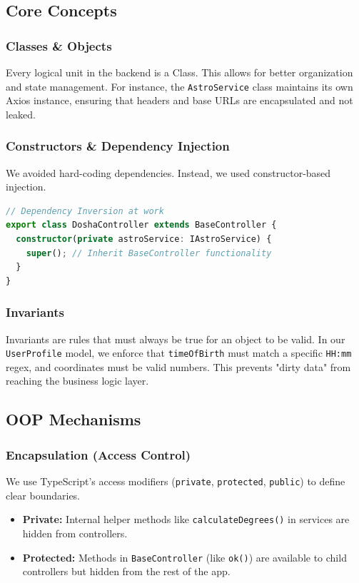 \documentclass[12pt,a4paper]{article}
\begin{document}
\subsection{Core Concepts}
\subsubsection{Classes \& Objects}
Every logical unit in the backend is a Class. This allows for better organization and state management. For instance, the \texttt{AstroService} class maintains its own Axios instance, ensuring that headers and base URLs are encapsulated and not leaked.

\subsubsection{Constructors \& Dependency Injection}
We avoided hard-coding dependencies. Instead, we used constructor-based injection.
\begin{lstlisting}[language=TypeScript]
// Dependency Inversion at work
export class DoshaController extends BaseController {
  constructor(private astroService: IAstroService) { 
    super(); // Inherit BaseController functionality
  }
}
\end{lstlisting}

\subsubsection{Invariants}
Invariants are rules that must always be true for an object to be valid. In our \texttt{UserProfile} model, we enforce that \texttt{timeOfBirth} must match a specific \texttt{HH:mm} regex, and coordinates must be valid numbers. This prevents "dirty data" from reaching the business logic layer.

\subsection{OOP Mechanisms}
\subsubsection{Encapsulation (Access Control)}
We use TypeScript's access modifiers (\texttt{private}, \texttt{protected}, \texttt{public}) to define clear boundaries.
\begin{itemize}
    \item \textbf{Private:} Internal helper methods like \texttt{calculateDegrees()} in services are hidden from controllers.
    \item \textbf{Protected:} Methods in \texttt{BaseController} (like \texttt{ok()}) are available to child controllers but hidden from the rest of the app.
\end{itemize}
\end{document}
